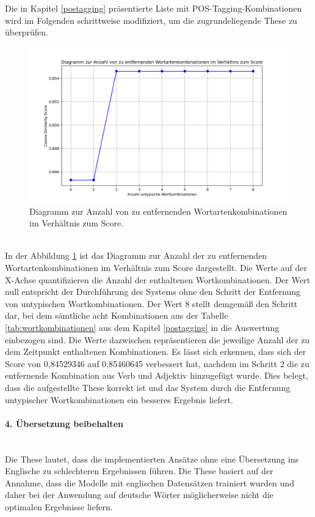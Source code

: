 Die in Kapitel \ref{postagging} präsentierte Liste mit POS-Tagging-Kombinationen wird im Folgenden schrittweise modifiziert, um die zugrundeliegende These zu überprüfen.
\begin{figure}[H]
	\centering  
	\includegraphics[width=\linewidth]{plot/e3-wortkombinationen-score.png}
	\caption{Diagramm zur Anzahl von zu entfernenden Wortartenkombinationen im Verhältnis zum Score.}
	\label{fig:wordcombinationvsscore}
\end{figure}\mbox{} \\
In der Abbildung \ref{fig:wordcombinationvsscore} ist das Diagramm zur Anzahl der zu entfernenden Wortartenkombinationen im Verhältnis zum Score dargestellt. Die Werte auf der X-Achse quantifizieren die Anzahl der enthaltenen Wortkombinationen. Der Wert null entspricht der Durchführung des Systems ohne den Schritt der Entfernung von untypischen Wortkombinationen. Der Wert 8 stellt demgemäß den Schritt dar, bei dem sämtliche acht Kombinationen aus der Tabelle \ref{tab:wortkombinationen} aus dem Kapitel \ref{postagging} in die Auswertung einbezogen sind. Die Werte dazwischen repräsentieren die jeweilige Anzahl der zu dem Zeitpunkt enthaltenen Kombinationen. Es lässt sich erkennen, dass sich der Score von 0,84529346 auf 0,85460645 verbessert hat, nachdem im Schritt 2 die zu entfernende Kombination aus Verb und Adjektiv hinzugefügt wurde. Dies belegt, dass die aufgestellte These korrekt ist und das System durch die Entfernung untypischer Wortkombinationen ein besseres Ergebnis liefert.
\paragraph{4. Übersetzung beibehalten}\mbox{}\\
Die These lautet, dass die implementierten Ansätze ohne eine Übersetzung ins Englische zu schlechteren Ergebnissen führen. Die These basiert auf der Annahme, dass die Modelle mit englischen Datensätzen trainiert wurden und daher bei der Anwendung auf deutsche Wörter möglicherweise nicht die optimalen Ergebnisse liefern.\\

